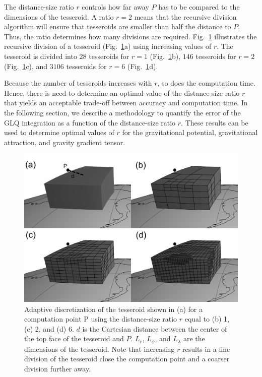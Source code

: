 The distance-size ratio $r$ controls
how far away $P$ has to be
compared to the dimensions of the tesseroid.
A ratio $r=2$ means that
the recursive division algorithm will ensure that
tesseroids are smaller than
half the distance to $P$.
Thus, the ratio determines how many divisions are required.
Fig.~\ref{fig:ratio}
illustrates the recursive division of a tesseroid
(Fig.~\ref{fig:ratio}a)
using increasing values of $r$.
The tesseroid is divided into
$28$ tesseroids for $r=1$ (Fig.~\ref{fig:ratio}b),
$146$ tesseroids for $r=2$ (Fig.~\ref{fig:ratio}c),
and $3106$ tesseroids for $r=6$ (Fig.~\ref{fig:ratio}d).

Because the number of tesseroids increases with $r$,
so does the computation time.
Hence, there is need to determine
an optimal value of the distance-size ratio $r$
that yields an acceptable trade-off between
accuracy and computation time.
In the following section,
we describe a methodology
to quantify the error of the GLQ integration
as a function of the distance-size ratio $r$.
These results can be used
to determine optimal values of $r$
for the gravitational potential,
gravitational attraction,
and gravity gradient tensor.

\begin{figure}
    \centering
    \includegraphics{figs/tesseroid-split}
    \caption{
        Adaptive discretization
        of the tesseroid shown in (a)
        for a computation point P
        using the distance-size ratio $r$ equal to
        (b) 1, (c) 2, and (d) 6.
        $d$ is the Cartesian distance between
        the center of the top face of the tesseroid
        and $P$.
        $L_r$, $L_\phi$, and $L_\lambda$ are the dimensions of the tesseroid.
        Note that increasing $r$
        results in a fine division of the tesseroid
        close the computation point
        and a coarser division further away.
    }
    \label{fig:ratio}
\end{figure}

